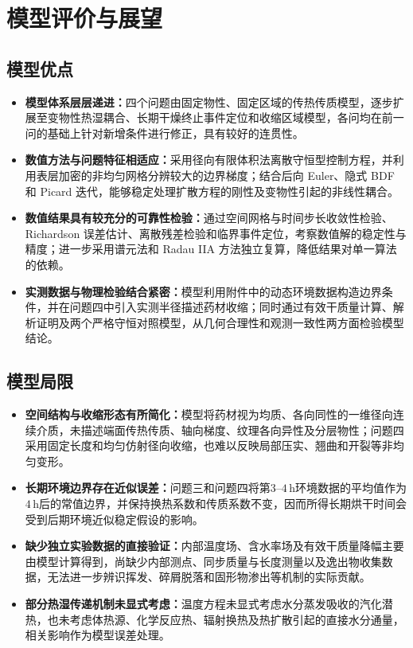 \documentclass[withoutpreface,bwprint]{cumcmthesis}
\begin{document}
\section{模型评价与展望}

\subsection{模型优点}
\begin{itemize}[leftmargin=2em,itemsep=2pt,topsep=2pt]
  \item \textbf{模型体系层层递进：}四个问题由固定物性、固定区域的传热传质模型，逐步扩展至变物性热湿耦合、长期干燥终止事件定位和收缩区域模型，各问均在前一问的基础上针对新增条件进行修正，具有较好的连贯性。
  \item \textbf{数值方法与问题特征相适应：}采用径向有限体积法离散守恒型控制方程，并利用表层加密的非均匀网格分辨较大的边界梯度；结合后向 Euler、隐式 BDF 和 Picard 迭代，能够稳定处理扩散方程的刚性及变物性引起的非线性耦合。
  \item \textbf{数值结果具有较充分的可靠性检验：}通过空间网格与时间步长收敛性检验、Richardson 误差估计、离散残差检验和临界事件定位，考察数值解的稳定性与精度；进一步采用谱元法和 Radau IIA 方法独立复算，降低结果对单一算法的依赖。
  \item \textbf{实测数据与物理检验结合紧密：}模型利用附件中的动态环境数据构造边界条件，并在问题四中引入实测半径描述药材收缩；同时通过有效干质量计算、解析证明及两个严格守恒对照模型，从几何合理性和观测一致性两方面检验模型结论。
\end{itemize}

\subsection{模型局限}
\begin{itemize}[leftmargin=2em,itemsep=2pt,topsep=2pt]
  \item \textbf{空间结构与收缩形态有所简化：}模型将药材视为均质、各向同性的一维径向连续介质，未描述端面传热传质、轴向梯度、纹理各向异性及分层物性；问题四采用固定长度和均匀仿射径向收缩，也难以反映局部压实、翘曲和开裂等非均匀变形。
  \item \textbf{长期环境边界存在近似误差：}问题三和问题四将第$3$--$4\,\mathrm h$环境数据的平均值作为$4\,\mathrm h$后的常值边界，并保持换热系数和传质系数不变，因而所得长期烘干时间会受到后期环境近似稳定假设的影响。
  \item \textbf{缺少独立实验数据的直接验证：}内部温度场、含水率场及有效干质量降幅主要由模型计算得到，尚缺少内部测点、同步质量与长度测量以及逸出物收集数据，无法进一步辨识挥发、碎屑脱落和固形物渗出等机制的实际贡献。
  \item \textbf{部分热湿传递机制未显式考虑：}温度方程未显式考虑水分蒸发吸收的汽化潜热，也未考虑体热源、化学反应热、辐射换热及热扩散引起的直接水分通量，相关影响作为模型误差处理。
\end{itemize}
\end{document}
